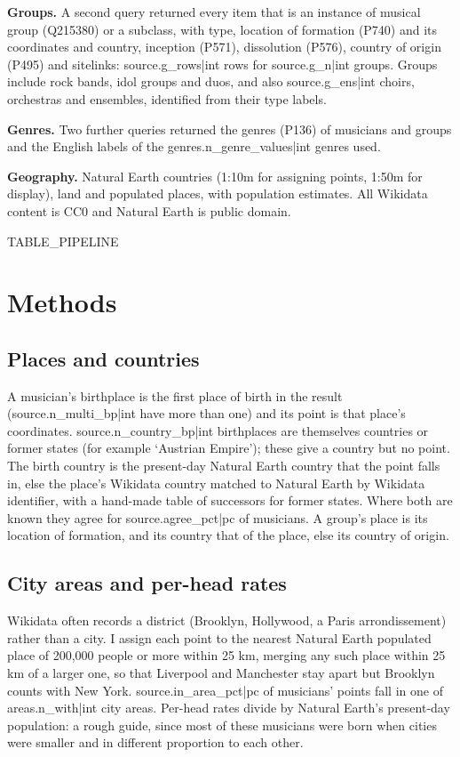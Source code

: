 \documentclass[11pt,a4paper]{article}
\begin{document}
\textbf{Groups.} A second query returned every item that is an instance of musical group (Q215380) or a subclass, with type, location of formation (P740) and its coordinates and country, inception (P571), dissolution (P576), country of origin (P495) and sitelinks: {{source.g_rows|int}} rows for {{source.g_n|int}} groups. Groups include rock bands, idol groups and duos, and also {{source.g_ens|int}} choirs, orchestras and ensembles, identified from their type labels.

\textbf{Genres.} Two further queries returned the genres (P136) of musicians and groups and the English labels of the {{genres.n_genre_values|int}} genres used.

\textbf{Geography.} Natural Earth \citep{naturalearth} countries (1:10m for assigning points, 1:50m for display), land and populated places, with population estimates. All Wikidata content is CC0 and Natural Earth is public domain.

{{TABLE_PIPELINE}}

\section{Methods}
\subsection{Places and countries}
A musician's birthplace is the first place of birth in the result ({{source.n_multi_bp|int}} have more than one) and its point is that place's coordinates. {{source.n_country_bp|int}} birthplaces are themselves countries or former states (for example `Austrian Empire'); these give a country but no point. The birth country is the present-day Natural Earth country that the point falls in, else the place's Wikidata country matched to Natural Earth by Wikidata identifier, with a hand-made table of successors for former states. Where both are known they agree for {{source.agree_pct|pc}} of musicians. A group's place is its location of formation, and its country that of the place, else its country of origin.

\subsection{City areas and per-head rates}
Wikidata often records a district (Brooklyn, Hollywood, a Paris arrondissement) rather than a city. I assign each point to the nearest Natural Earth populated place of 200,000 people or more within 25 km, merging any such place within 25 km of a larger one, so that Liverpool and Manchester stay apart but Brooklyn counts with New York. {{source.in_area_pct|pc}} of musicians' points fall in one of {{areas.n_with|int}} city areas. Per-head rates divide by Natural Earth's present-day population: a rough guide, since most of these musicians were born when cities were smaller and in different proportion to each other.
\end{document}
